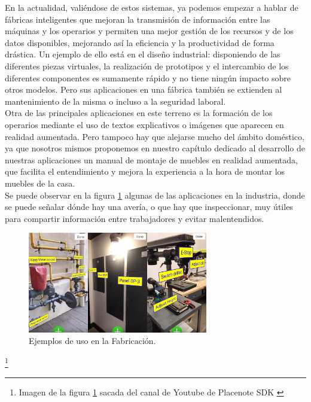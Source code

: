 En la actualidad, valiéndose de estos sistemas, ya podemos empezar a hablar de fábricas inteligentes que mejoran la transmisión de información entre las máquinas y los operarios y permiten una mejor gestión de los recursos y de los datos disponibles, mejorando así la eficiencia y la productividad de forma drástica. Un ejemplo de ello está en el diseño industrial: disponiendo de las diferentes piezas virtuales, la realización de prototipos y el intercambio de los diferentes componentes es sumamente rápido y no tiene ningún impacto sobre otros modelos. Pero sus aplicaciones en una fábrica también se extienden al mantenimiento de la misma o incluso a la seguridad laboral.\cite{Neosentec_Fab}\\ 

Otra de las principales aplicaciones en este terreno es la formación de los operarios mediante el uso de textos explicativos o imágenes que aparecen en realidad aumentada. Pero tampoco hay que alejarse mucho del ámbito doméstico, ya que nosotros mismos proponemos en nuestro capítulo dedicado al desarrollo de nuestras aplicaciones un manual de montaje de muebles en realidad aumentada, que facilita el entendimiento y mejora la experiencia a la hora de montar los muebles de la casa.\\

Se puede observar en la figura \ref{fig:placenote} algunas de las aplicaciones en la industria, donde se puede señalar dónde hay una avería, o que hay que inspeccionar, muy útiles para compartir información entre trabajadores y evitar malentendidos.

\begin{figure}[H]
     \centering
     \includegraphics[width=0.7\textwidth]{Images/Placenote.jpg}
     \caption{Ejemplos de uso en la Fabricación.}
     \label{fig:placenote}
 \end{figure}
 {\let\thefootnote\relax\footnote{{Imagen de la figura \ref{fig:placenote} sacada del canal de Youtube de Placenote SDK \cite{PlacenoteYT}}}}

